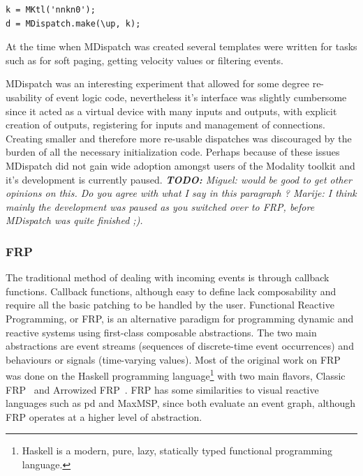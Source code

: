 \documentclass{article}
\newcommand{\todo}[1] {\emph{\textbf{TODO:} #1}}
\begin{document}
\begin{Verbatim}
k = MKtl('nnkn0');
d = MDispatch.make(\up, k);
\end{Verbatim}

At the time when MDispatch was created several templates were written for tasks such as for soft paging, getting velocity values or filtering events. 

MDispatch was an interesting experiment that allowed for some degree re-usability of event logic code, nevertheless it's interface was slightly cumbersome since it acted as a virtual device with many inputs and outputs, with explicit creation of outputs, registering for inputs and management of connections. Creating smaller and therefore more re-usable dispatches was discouraged by the burden of all the necessary initialization code. Perhaps because of these issues MDispatch did not gain wide adoption amongst users of the Modality toolkit and it's development is currently paused.
\todo{ Miguel: would be good to get other opinions on this. Do you agree with what I say in this paragraph ? Marije: I think mainly the development was paused as you switched over to FRP, before MDispatch was quite finished ;).}
		
\subsubsection{FRP}
\label{sub:frp}


The traditional method of dealing with incoming events is through callback functions. Callback functions, although easy to define lack composability and require all the basic patching to be handled by the user. Functional Reactive Programming, or FRP, is an alternative paradigm for programming dynamic and reactive systems using first-class composable abstractions. The two main abstractions are event streams (sequences of discrete-time event occurrences) and behaviours or signals (time-varying values). Most of the original work on FRP was done on the Haskell programming language\footnote{Haskell is a modern, pure, lazy, statically typed functional programming language.} with two main flavors, Classic FRP~\cite{elliott1997-fun,elliott2009-pus} and Arrowized FRP~\cite{hudak2003-arr,courtney2003yampa}. FRP has some similarities to visual reactive languages such as pd and MaxMSP, since both evaluate an event graph, although FRP operates at a higher level of abstraction.
\end{document}
